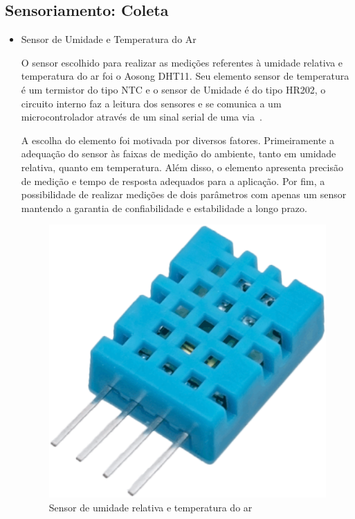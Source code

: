   \subsection{Sensoriamento: Coleta}

  \begin{itemize}

  \item Sensor de Umidade e Temperatura do Ar

  O sensor escolhido para realizar as medições referentes à umidade relativa e
  temperatura do ar foi o Aosong DHT11. Seu elemento sensor de temperatura é um
  termistor do tipo NTC e o sensor de Umidade é do tipo HR202, o circuito interno
  faz a leitura dos sensores e se comunica a um microcontrolador através de um
  sinal serial de uma via~\cite{AOSONG}.

  A escolha do elemento foi motivada por diversos fatores. Primeiramente a
  adequação do sensor às faixas de medição do ambiente, tanto em umidade
  relativa, quanto em temperatura. Além disso, o elemento apresenta precisão de
  medição e tempo de resposta adequados para a aplicação.  Por fim, a
  possibilidade de realizar medições de dois parâmetros com apenas um sensor
  mantendo a garantia de confiabilidade e estabilidade a longo prazo.

  \begin{figure}[!htbp]
  \begin{center}
  \includegraphics[keepaspectratio=true,scale=0.1]{figuras/dht-11.eps}
  \caption{\label{DHT11}Sensor de umidade relativa e temperatura do ar}
  \end{center}
  \end{figure}


\end{itemize}
